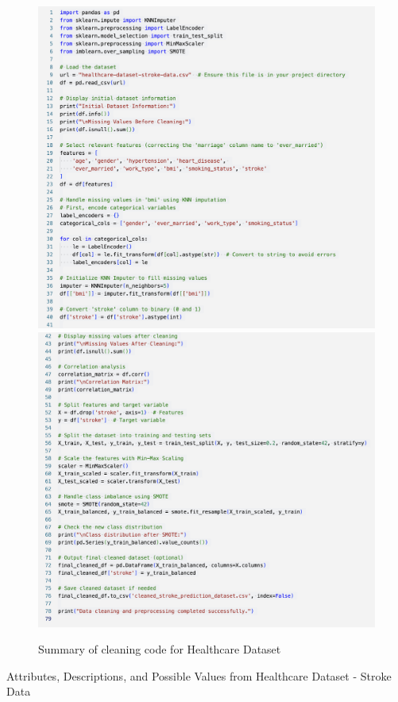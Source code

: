 \documentclass[runningheads]{llncs}
\begin{document}
\begin{enumerate}
\clearpage
\begin{figure}
    \centering
    \includegraphics[width=.75\linewidth]{Cleaning1.png}
    \centering
    \includegraphics[width=.75\linewidth]{Cleaning2.png}
    \caption{Summary of cleaning code for Healthcare Dataset} 
    \label{fig:enter-label}
\end{figure}

\clearpage
\begin{table}[ht]
\centering    
\caption{Attributes, Descriptions, and Possible Values from Healthcare Dataset - Stroke Data} 
\label{tab1} 


\end{table}
\end{enumerate}
\end{document}
